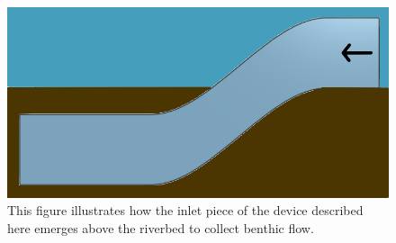 \documentclass[fleqn,10pt]{SelfArx} %
\begin{document}
	\begin{figure}[h]
		\centering
		\includegraphics[width=1\linewidth]{Figures/InletInSitu}
		\caption[Inlet 2D Model]{This figure illustrates how the inlet piece of the device described here emerges above the riverbed to collect \gls{benthic} flow.}
		\label{fig:InletInSitu}
	\end{figure}
	
\end{document}
